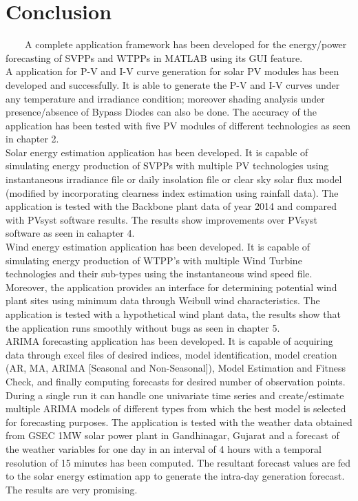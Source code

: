 
\section{Conclusion}
\
\
\
\
A complete application framework has been developed for the energy/power forecasting of SVPPs and WTPPs in MATLAB using its GUI feature.\\

A application for P-V and I-V curve generation for solar PV modules has been developed and successfully. It is able to generate the P-V and I-V curves under any temperature and irradiance condition; moreover shading analysis under presence/absence of Bypass Diodes can also be done. The accuracy of the application has been tested with five PV modules of different technologies as seen in chapter 2.\\

Solar energy estimation application has been developed. It is capable of simulating energy production of SVPPs with multiple PV technologies using instantaneous irradiance file or daily insolation file or clear sky solar flux model (modified by incorporating clearness index estimation using rainfall data). The application is tested with the Backbone plant data of year 2014 and compared with PVsyst software results. The results show improvements over PVsyst software as seen in cahapter 4.\\

Wind energy estimation application has been developed. It is capable of simulating energy production of WTPP's with multiple Wind Turbine technologies and their sub-types using the instantaneous wind speed file. Moreover, the application provides an interface for determining potential wind plant sites using minimum data through Weibull wind characteristics. The application is tested with a hypothetical wind plant data, the results show that the application runs smoothly without bugs as seen in chapter 5.\\

ARIMA forecasting application has been developed. It is capable of acquiring data through excel files of desired indices, model identification, model creation (AR, MA, ARIMA [Seasonal and Non-Seasonal]), Model Estimation and Fitness Check, and finally computing forecasts for desired number of observation points. During a single run it can handle one univariate time series and create/estimate multiple ARIMA models of different types from which the best model is selected for forecasting purposes. The application is tested with the weather data obtained from GSEC 1MW solar power plant in Gandhinagar, Gujarat and a forecast of the weather variables for one day in an interval of 4 hours with a temporal resolution of 15 minutes has been computed. The resultant forecast values are fed to the solar energy estimation app to generate the intra-day generation forecast. The results are very promising. \\

